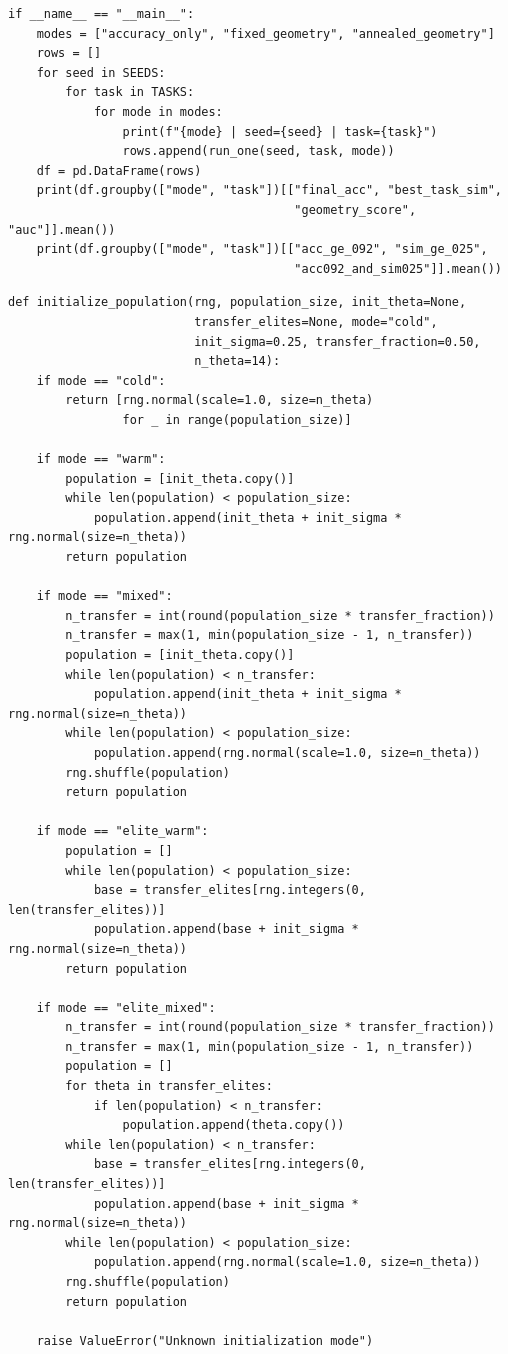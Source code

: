 \documentclass[11pt,a4paper]{report}
\begin{document}
\begin{lstlisting}[style=python,caption={Unified Python code for Meta-SBOHN v5/v6 tests.}]
if __name__ == "__main__":
    modes = ["accuracy_only", "fixed_geometry", "annealed_geometry"]
    rows = []
    for seed in SEEDS:
        for task in TASKS:
            for mode in modes:
                print(f"{mode} | seed={seed} | task={task}")
                rows.append(run_one(seed, task, mode))
    df = pd.DataFrame(rows)
    print(df.groupby(["mode", "task"])[["final_acc", "best_task_sim",
                                        "geometry_score", "auc"]].mean())
    print(df.groupby(["mode", "task"])[["acc_ge_092", "sim_ge_025",
                                        "acc092_and_sim025"]].mean())
\end{lstlisting}

\label{app:ch8-lst2}
\begin{lstlisting}[style=python,caption={Population initialization for curriculum and elite transfer.}]
def initialize_population(rng, population_size, init_theta=None,
                          transfer_elites=None, mode="cold",
                          init_sigma=0.25, transfer_fraction=0.50,
                          n_theta=14):
    if mode == "cold":
        return [rng.normal(scale=1.0, size=n_theta)
                for _ in range(population_size)]

    if mode == "warm":
        population = [init_theta.copy()]
        while len(population) < population_size:
            population.append(init_theta + init_sigma * rng.normal(size=n_theta))
        return population

    if mode == "mixed":
        n_transfer = int(round(population_size * transfer_fraction))
        n_transfer = max(1, min(population_size - 1, n_transfer))
        population = [init_theta.copy()]
        while len(population) < n_transfer:
            population.append(init_theta + init_sigma * rng.normal(size=n_theta))
        while len(population) < population_size:
            population.append(rng.normal(scale=1.0, size=n_theta))
        rng.shuffle(population)
        return population

    if mode == "elite_warm":
        population = []
        while len(population) < population_size:
            base = transfer_elites[rng.integers(0, len(transfer_elites))]
            population.append(base + init_sigma * rng.normal(size=n_theta))
        return population

    if mode == "elite_mixed":
        n_transfer = int(round(population_size * transfer_fraction))
        n_transfer = max(1, min(population_size - 1, n_transfer))
        population = []
        for theta in transfer_elites:
            if len(population) < n_transfer:
                population.append(theta.copy())
        while len(population) < n_transfer:
            base = transfer_elites[rng.integers(0, len(transfer_elites))]
            population.append(base + init_sigma * rng.normal(size=n_theta))
        while len(population) < population_size:
            population.append(rng.normal(scale=1.0, size=n_theta))
        rng.shuffle(population)
        return population

    raise ValueError("Unknown initialization mode")
\end{lstlisting}
\end{document}

